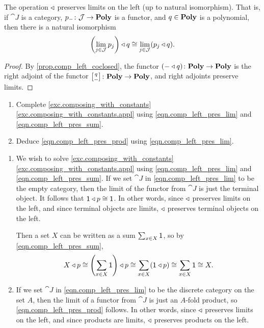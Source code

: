 \documentclass[Book-Poly]{subfiles}
\begin{document}

\begin{proposition} \label{prop.left_pres_lim}
The operation $\mathbin{\triangleleft}$ preserves limits on the left (up to natural isomorphism).
That is, if $\cat{J}$ is a category, $p_-\colon\mathcal{J}\to\mathbf{Poly}$ is a functor, and $q\in\mathbf{Poly}$ is a polynomial, then there is a natural isomorphism
\begin{equation} \label{eqn.comp_left_pres_lim}
    \left(\lim_{j\in\mathcal{J}}p_j\right)\mathbin{\triangleleft} q\cong\lim_{j\in\mathcal{J}}(p_j\mathbin{\triangleleft} q).
\end{equation}
\end{proposition}
\begin{proof}
By \cref{prop.comp_left_coclosed}, the functor $(-\mathbin{\triangleleft} q)\colon\mathbf{Poly}\to\mathbf{Poly}$ is the right adjoint of the functor $\lchom{q}{-}\colon\poly\to\poly$, and right adjoints preserve limits.
\end{proof}

\begin{exercise} \label{exc.comp_left_pres_lim}
\begin{enumerate}
    \item Complete \cref{exc.composing_with_constants} \cref{exc.composing_with_constants.appl} using \eqref{eqn.comp_left_pres_lim} and \eqref{eqn.comp_left_pres_sum}.
    \item \label{exc.comp_left_pres_lim.prod} Deduce \eqref{eqn.comp_left_pres_prod} using \eqref{eqn.comp_left_pres_lim}.\qedhere
\end{enumerate}
\begin{solution}
\begin{enumerate}
    \item We wish to solve \cref{exc.composing_with_constants} \cref{exc.composing_with_constants.appl} using \eqref{eqn.comp_left_pres_lim} and \eqref{eqn.comp_left_pres_sum}.
    If we set $\cat{J}$ in \eqref{eqn.comp_left_pres_lim} to be the empty category, then the limit of the functor from $\cat{J}$ is just the terminal object.
    It follows that $\textsf{1}\mathbin{\triangleleft} p\cong\textsf{1}$.
    In other words, since $\mathbin{\triangleleft}$ preserves limits on the left, and since terminal objects are limits, $\mathbin{\triangleleft}$ preserves terminal objects on the left.
    
    Then a set $X$ can be written as a sum $\sum_{x\in X}\textsf{1}$, so by \eqref{eqn.comp_left_pres_sum},
    \[
        X\mathbin{\triangleleft} p\cong\left(\sum_{x\in X}\textsf{1}\right)\mathbin{\triangleleft} p\cong\sum_{x\in X}(\textsf{1}\mathbin{\triangleleft} p)\cong\sum_{x\in X}\textsf{1}\cong X.
    \]
    
    \item If we set $\cat{J}$ in \eqref{eqn.comp_left_pres_lim} to be the discrete category on the set $A$, then the limit of a functor from $\cat{J}$ is just an $A$-fold product, so \eqref{eqn.comp_left_pres_prod} follows.
    In other words, since $\mathbin{\triangleleft}$ preserves limits on the left, and since products are limits, $\mathbin{\triangleleft}$ preserves products on the left.
\end{enumerate}
\end{solution}
\end{exercise}
\end{document}
